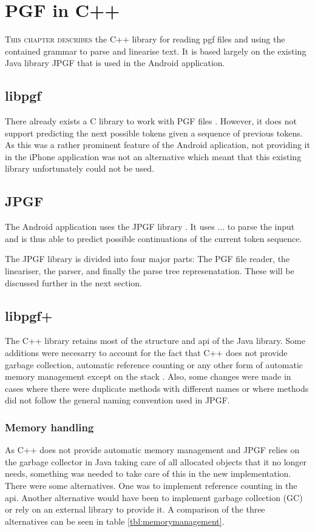 \chapter{PGF in C++}
\lettrine[lines=4, loversize=-0.1, lraise=0.1]{T}{his chapter describes} the C++ library for reading pgf files and using the contained grammar to parse and linearise text. It is based largely on the existing Java library JPGF that is used in the Android application.


\section{libpgf}
There already exists a C library to work with PGF files \cite{libpgf}. However, it does not support predicting the next possible tokens given a sequence of previous tokens. As this was a rather prominent feature of the Android aplication, not providing it in the iPhone application was not an alternative which meant that this existing library unfortunately could not be used.


\section{JPGF}
The Android application uses the JPGF library \cite{jpgf}. It uses ... to parse the input and is thus able to predict possible continuations of the current token sequence.

The JPGF library is divided into four major parts: The PGF file reader, the lineariser, the parser, and finally the parse tree represenatation. These will be discussed further in the next section.


\section{libpgf+}
The C++ library retains most of the structure and api of the Java library. Some additions were necesarry to account for the fact that C++ does not provide garbage collection, automatic reference counting or any other form of automatic memory management except on the stack \cite{cppmemoryhandling}. Also, some changes were made in cases where there were duplicate methods with different names or where methods did not follow the general naming convention used in JPGF.


\subsection{Memory handling}
As C++ does not provide automatic memory management and JPGF relies on the garbage collector in Java taking care of all allocated objects that it no longer needs, something was needed to take care of this in the new implementation. There were some alternatives. One was to implement reference counting \cite{refcount} in the api. Another alternative would have been to implement garbage collection (GC) \cite{gc} or rely on an external library to provide it. A comparison of the three alternatives can be seen in table \ref{tbl:memorymanagement}.

